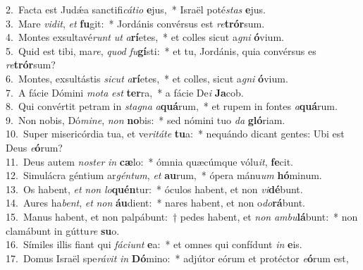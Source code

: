 {2.~}Facta est Judǽa sanctifi\textit{cá}\textit{ti}\textit{o} \textbf{e}jus,~* Israël poté\textit{stas} \textbf{e}jus.\\
{3.~}Mare \textit{vi}\textit{dit}, \textit{et} \textbf{fu}git:~* Jordánis convérsus est \textit{re}\textbf{trór}sum.\\
{4.~}Montes exsultavé\textit{runt} \textit{ut} \textit{a}\textbf{rí}etes,~* et colles sicut a\textit{gni} \textbf{ó}vium.\\
{5.~}Quid est tibi, ma\textit{re}, \textit{quod} \textit{fu}\textbf{gí}sti:~* et tu, Jordánis, quia convérsus es \textit{re}\textbf{trór}sum?\\
{6.~}Montes, exsultástis \textit{si}\textit{cut} \textit{a}\textbf{rí}etes,~* et colles, sicut a\textit{gni} \textbf{ó}vium.\\
{7.~}A fácie Dómini \textit{mo}\textit{ta} \textit{est} \textbf{ter}ra,~* a fácie De\textit{i} \textbf{Ja}cob.\\
{8.~}Qui convértit petram in \textit{sta}\textit{gna} \textit{a}\textbf{quá}rum,~* et rupem in fontes \textit{a}\textbf{quá}rum.\\
{9.~}Non nobis, Dó\textit{mi}\textit{ne}, \textit{non} \textbf{no}bis:~* sed nómini tuo \textit{da} \textbf{gló}riam.\\
{10.~}Super misericórdia tua, et ve\textit{ri}\textit{tá}\textit{te} \textbf{tu}a:~* nequándo dicant gentes: Ubi est Deus \textit{e}\textbf{ó}rum?\\
{11.~}Deus autem \textit{no}\textit{ster} \textit{in} \textbf{cæ}lo:~* ómnia quæcúmque vólu\textit{it}, \textbf{fe}cit.\\
{12.~}Simulácra géntium ar\textit{gén}\textit{tum}, \textit{et} \textbf{au}rum,~* ópera mánu\textit{um} \textbf{hó}minum.\\
{13.~}Os habent, \textit{et} \textit{non} \textit{lo}\textbf{quén}tur:~* óculos habent, et non \textit{vi}\textbf{dé}bunt.\\
{14.~}Aures ha\textit{bent}, \textit{et} \textit{non} \textbf{áu}dient:~* nares habent, et non o\textit{do}\textbf{rá}bunt.\\
{15.~}Manus habent, et non palpábunt:~† pedes habent, et \textit{non} \textit{am}\textit{bu}\textbf{lá}bunt:~* non clamábunt in gúttu\textit{re} \textbf{su}o.\\
{16.~}Símiles illis fiant qui \textit{fá}\textit{ci}\textit{unt} \textbf{e}a:~* et omnes qui confídunt \textit{in} \textbf{e}is.\\
{17.~}Domus Israël spe\textit{rá}\textit{vit} \textit{in} \textbf{Dó}mino:~* adjútor eórum et protéctor \textit{e}\textbf{ó}rum est,\\
